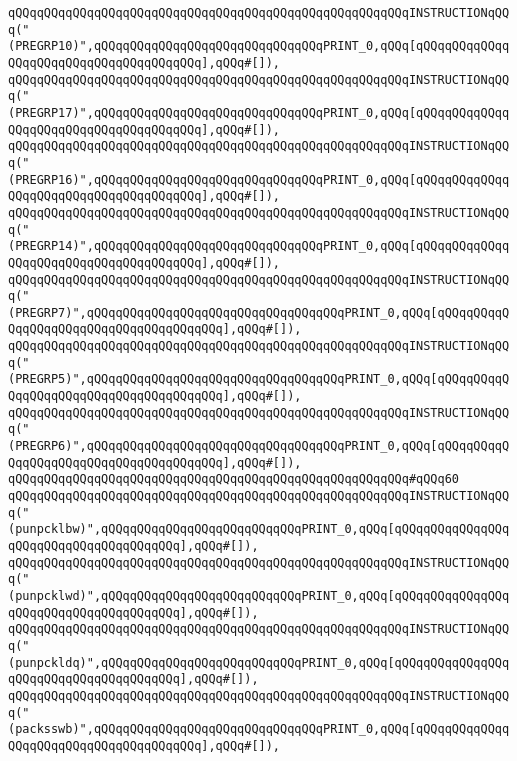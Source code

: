 \verb|qQQqqQQqqQQqqQQqqQQqqQQqqQQqqQQqqQQqqQQqqQQqqQQqqQQqqQQqINSTRUCTIONqQQq("(PREGRP10)",qQQqqQQqqQQqqQQqqQQqqQQqqQQqqQQqPRINT_0,qQQq[qQQqqQQqqQQqqQQqqQQqqQQqqQQqqQQqqQQqqQQq],qQQq#[]),|\newline
\verb|qQQqqQQqqQQqqQQqqQQqqQQqqQQqqQQqqQQqqQQqqQQqqQQqqQQqqQQqINSTRUCTIONqQQq("(PREGRP17)",qQQqqQQqqQQqqQQqqQQqqQQqqQQqqQQqPRINT_0,qQQq[qQQqqQQqqQQqqQQqqQQqqQQqqQQqqQQqqQQqqQQq],qQQq#[]),|\newline
\verb|qQQqqQQqqQQqqQQqqQQqqQQqqQQqqQQqqQQqqQQqqQQqqQQqqQQqqQQqINSTRUCTIONqQQq("(PREGRP16)",qQQqqQQqqQQqqQQqqQQqqQQqqQQqqQQqPRINT_0,qQQq[qQQqqQQqqQQqqQQqqQQqqQQqqQQqqQQqqQQqqQQq],qQQq#[]),|\newline
\verb|qQQqqQQqqQQqqQQqqQQqqQQqqQQqqQQqqQQqqQQqqQQqqQQqqQQqqQQqINSTRUCTIONqQQq("(PREGRP14)",qQQqqQQqqQQqqQQqqQQqqQQqqQQqqQQqPRINT_0,qQQq[qQQqqQQqqQQqqQQqqQQqqQQqqQQqqQQqqQQqqQQq],qQQq#[]),|\newline
\verb|qQQqqQQqqQQqqQQqqQQqqQQqqQQqqQQqqQQqqQQqqQQqqQQqqQQqqQQqINSTRUCTIONqQQq("(PREGRP7)",qQQqqQQqqQQqqQQqqQQqqQQqqQQqqQQqqQQqPRINT_0,qQQq[qQQqqQQqqQQqqQQqqQQqqQQqqQQqqQQqqQQqqQQq],qQQq#[]),|\newline
\verb|qQQqqQQqqQQqqQQqqQQqqQQqqQQqqQQqqQQqqQQqqQQqqQQqqQQqqQQqINSTRUCTIONqQQq("(PREGRP5)",qQQqqQQqqQQqqQQqqQQqqQQqqQQqqQQqqQQqPRINT_0,qQQq[qQQqqQQqqQQqqQQqqQQqqQQqqQQqqQQqqQQqqQQq],qQQq#[]),|\newline
\verb|qQQqqQQqqQQqqQQqqQQqqQQqqQQqqQQqqQQqqQQqqQQqqQQqqQQqqQQqINSTRUCTIONqQQq("(PREGRP6)",qQQqqQQqqQQqqQQqqQQqqQQqqQQqqQQqqQQqPRINT_0,qQQq[qQQqqQQqqQQqqQQqqQQqqQQqqQQqqQQqqQQqqQQq],qQQq#[]),|\newline
\verb|qQQqqQQqqQQqqQQqqQQqqQQqqQQqqQQqqQQqqQQqqQQqqQQqqQQqqQQq#qQQq60|\newline
\verb|qQQqqQQqqQQqqQQqqQQqqQQqqQQqqQQqqQQqqQQqqQQqqQQqqQQqqQQqINSTRUCTIONqQQq("(punpcklbw)",qQQqqQQqqQQqqQQqqQQqqQQqqQQqPRINT_0,qQQq[qQQqqQQqqQQqqQQqqQQqqQQqqQQqqQQqqQQqqQQq],qQQq#[]),|\newline
\verb|qQQqqQQqqQQqqQQqqQQqqQQqqQQqqQQqqQQqqQQqqQQqqQQqqQQqqQQqINSTRUCTIONqQQq("(punpcklwd)",qQQqqQQqqQQqqQQqqQQqqQQqqQQqPRINT_0,qQQq[qQQqqQQqqQQqqQQqqQQqqQQqqQQqqQQqqQQqqQQq],qQQq#[]),|\newline
\verb|qQQqqQQqqQQqqQQqqQQqqQQqqQQqqQQqqQQqqQQqqQQqqQQqqQQqqQQqINSTRUCTIONqQQq("(punpckldq)",qQQqqQQqqQQqqQQqqQQqqQQqqQQqPRINT_0,qQQq[qQQqqQQqqQQqqQQqqQQqqQQqqQQqqQQqqQQqqQQq],qQQq#[]),|\newline
\verb|qQQqqQQqqQQqqQQqqQQqqQQqqQQqqQQqqQQqqQQqqQQqqQQqqQQqqQQqINSTRUCTIONqQQq("(packsswb)",qQQqqQQqqQQqqQQqqQQqqQQqqQQqqQQqPRINT_0,qQQq[qQQqqQQqqQQqqQQqqQQqqQQqqQQqqQQqqQQqqQQq],qQQq#[]),|\newline
